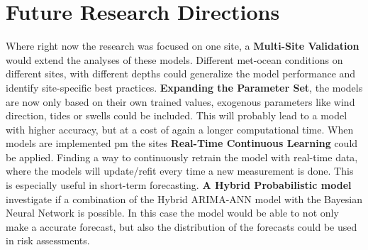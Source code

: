 \section{Future Research Directions}
\label{future research directions}
Where right now the research was focused on one site, a \textbf{Multi-Site Validation} would extend the analyses of these models. Different met-ocean conditions on different sites, with different depths could generalize the model performance and identify site-specific best practices. \textbf{Expanding the Parameter Set}, the models are now only based on their own trained values, exogenous parameters like wind direction, tides or swells could be included. This will probably lead to a model with higher accuracy, but at a cost of again a longer computational time. When models are implemented pm the sites \textbf{Real-Time Continuous Learning} could be applied. Finding a way to continuously retrain the model with real-time data, where the models will update/refit every time a new measurement is done. This is especially useful in short-term forecasting. \textbf{A Hybrid Probabilistic model} investigate if a combination of the Hybrid ARIMA-ANN model with the Bayesian Neural Network is possible. In this case the model would be able to not only make a accurate forecast, but also the distribution of the forecasts could be used in risk assessments. 